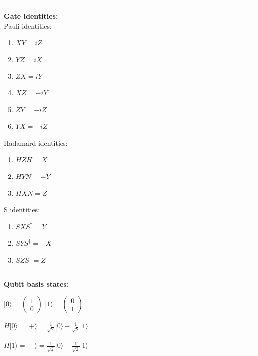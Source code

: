 \documentclass{article}
\begin{document}
\vspace{5pt}
\hrule
\vspace{5pt}


\textbf{Gate identities:} \\

Pauli identities:
\begin{multicols}{2}
	\begin{enumerate}
		\item $ XY = iZ $
		\item $ YZ = iX $
		\item $ ZX = iY $
	\columnbreak
		\item $ XZ = -iY $
		\item $ ZY = -iZ $
		\item $ YX = -iZ $
	\end{enumerate}
\end{multicols}

\begin{multicols}{2}
Hadamard identities:
	\begin{enumerate}
		\item $ HZH = X $
		\item $ HYN = -Y $
		\item $ HXN = Z $
	\end{enumerate}
\columnbreak

S identities:
	\begin{enumerate}
		\item $ SXS^\dagger = Y $
		\item $ SYS^\dagger  = -X $
		\item $ SZS^\dagger  = Z $
	\end{enumerate}
\end{multicols}

\vspace{5pt}
\hrule
\vspace{5pt}
\textbf{Qubit basis states:}

\begin{center}
$ |0\rangle =  \left(
				\begin{array}{c}
					 1 \\
					 0
				\end{array}
			\right)
$
\quad
$ |1\rangle =  \left(
				\begin{array}{c}
					 0 \\
					 1
				\end{array}
			\right)
$
\end{center}

\begin{center}
$H|0\rangle = |+ \rangle =  \frac{1}{\sqrt{2}} |0\rangle + \frac{1}{\sqrt{2}}|1\rangle$

$H|1\rangle = |- \rangle = \frac{1}{\sqrt{2}} |0\rangle - \frac{1}{\sqrt{2}}|1\rangle$
\end{center}
\end{document}

